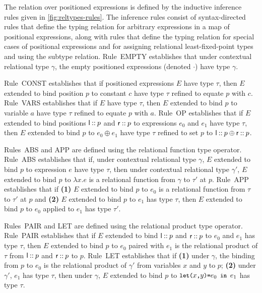 
The relation over positioned expressions is defined by the inductive
inference rules given in \autoref{fig:reltypes-rules}.
%
The inference rules consist of syntax-directed rules that define the
typing relation for arbitrary expressions in a map of positional
expressions, along with rules that define the typing relation for
special cases of positional expressions and for assigning relational
least-fixed-point types and using the subtype relation.
Rule~EMPTY establishes that under contextual relational type $\gamma$,
the empty positioned expressions (denoted $\cdot$) have type $\gamma$.

Rule~CONST establishes that if positioned expressions $E$ have type
$\tau$, then $E$ extended to bind position $p$ to constant $c$ have
type $\tau$ refined to equate $p$ with $c$.
Rule~VARS establishes that if $E$ have type $\tau$, then $E$ extended
to bind $p$ to variable $a$ have type $\tau$ refined to equate $p$
with $a$.
Rule~OP establishes that if $E$ extended to bind positions
$\mathsf{l} \mathbin{::} p$ and $\mathsf{r} \mathbin{::} p$ to expressions $e_0$
and $e_1$ have type $\tau$, then $E$ extended to bind $p$ to
$e_0 \oplus e_1$ have type $\tau$ refined to set $p$ to
$\mathsf{l} \mathbin{::} p \oplus \mathsf{r} \mathbin{::} p$.

Rules~ABS and APP are defined using the relational function type
operator.
%
Rule~ABS establishes that if, under contextual relational type
$\gamma$, $E$ extended to bind $p$ to expression $e$ have type $\tau$,
then under contextual relational type $\gamma'$, $E$ extended to bind
$p$ to $\lambda x. e$ is a relational function from $\gamma$ to
$\tau'$ at $p$.
Rule~APP establishes that if %
\textbf{(1)} $E$ extended to bind $p$ to $e_0$ is a relational
function from $\tau$ to $\tau'$ at $p$ and %
\textbf{(2)} $E$ extended to bind $p$ to $e_1$ has type $\tau$, then
$E$ extended to bind $p$ to $e_0$ applied to $e_1$ has type $\tau'$.

Rules~PAIR and LET are defined using the relational product type
operator.
Rule~PAIR establishes that if $E$ extended to bind
$\mathsf{l} \mathbin{::} p$ and $\mathsf{r} \mathbin{::} p$ to $e_0$ and $e_1$ has
type $\tau$, then $E$ extended to bind $p$ to $e_0$ paired with $e_1$
is the relational product of $\tau$ from $\mathsf{l} \mathbin{::} p$ and
$\mathsf{r} \mathbin{::} p$ to $p$.
Rule~LET establishes that if %
\textbf{(1)} under $\gamma$, the binding from $p$ to $e_0$ is the
relational product of $\gamma'$ from variables $x$ and $y$ to $p$;
%
\textbf{(2)} under $\gamma'$, $e_1$ has type $\tau$, then under
$\gamma$, $E$ extended to bind $p$ to $\letexp{x}{y}{e_0}{e_1}$ has
type $\tau$.

